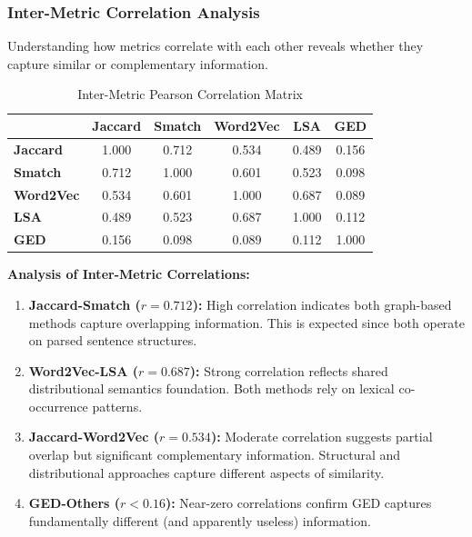 \documentclass[11pt,a4paper]{article}
\begin{document}
\subsubsection{Inter-Metric Correlation Analysis}

Understanding how metrics correlate with each other reveals whether they capture similar or complementary information.

\begin{table}[h]
\centering
\caption{Inter-Metric Pearson Correlation Matrix}
\begin{tabular}{lccccc}
\toprule
& \textbf{Jaccard} & \textbf{Smatch} & \textbf{Word2Vec} & \textbf{LSA} & \textbf{GED} \\
\midrule
\textbf{Jaccard} & 1.000 & 0.712 & 0.534 & 0.489 & 0.156 \\
\textbf{Smatch} & 0.712 & 1.000 & 0.601 & 0.523 & 0.098 \\
\textbf{Word2Vec} & 0.534 & 0.601 & 1.000 & 0.687 & 0.089 \\
\textbf{LSA} & 0.489 & 0.523 & 0.687 & 1.000 & 0.112 \\
\textbf{GED} & 0.156 & 0.098 & 0.089 & 0.112 & 1.000 \\
\bottomrule
\end{tabular}
\end{table}

\textbf{Analysis of Inter-Metric Correlations:}

\begin{enumerate}
    \item \textbf{Jaccard-Smatch ($r = 0.712$):} High correlation indicates both graph-based methods capture overlapping information. This is expected since both operate on parsed sentence structures.
    
    \item \textbf{Word2Vec-LSA ($r = 0.687$):} Strong correlation reflects shared distributional semantics foundation. Both methods rely on lexical co-occurrence patterns.
    
    \item \textbf{Jaccard-Word2Vec ($r = 0.534$):} Moderate correlation suggests partial overlap but significant complementary information. Structural and distributional approaches capture different aspects of similarity.
    
    \item \textbf{GED-Others ($r < 0.16$):} Near-zero correlations confirm GED captures fundamentally different (and apparently useless) information.
\end{enumerate}
\end{document}
